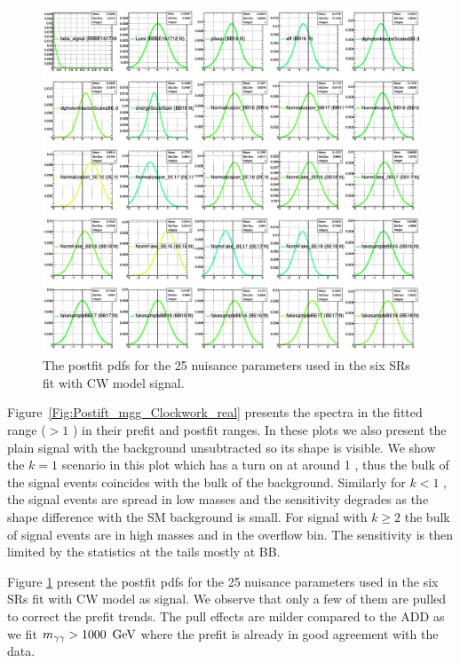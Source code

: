 \begin{figure}[h!]\centering
\includegraphics[width=1.\linewidth]{fig/POST_All_BBBE161718_CWk_real.png}
\caption{The postfit pdfs for the 25 nuisance parameters used in the six SRs fit with CW model signal.}
\label{Fig:Postift_Nuisances_Clockwork_real}
\end{figure}


Figure~\ref{Fig:Postift_mgg_Clockwork_real} presents the \mgg spectra in the fitted range ($>1$ \TeV) in their prefit and postfit ranges. In these plots we also present the plain signal with the background unsubtracted so its shape is visible. We show the $k=1$ \TeV scenario in this plot which has a turn on at around 1 \TeV, thus the bulk of the signal events coincides with the bulk of the background. Similarly for $k<1$ \TeV, the signal events are spread in low masses and the sensitivity degrades as the shape difference with the SM background is small. For signal with $k\ge2$ \TeV the bulk of signal events are in high masses and in the overflow \mgg bin. The sensitivity is then limited by the statistics at the tails mostly at BB.

Figure \ref{Fig:Postift_Nuisances_Clockwork_real} present the postfit pdfs for the 25 nuisance parameters used in the six SRs fit with CW model as signal.
We observe that only a few of them are pulled to correct the prefit trends.
The pull effects are milder compared to the ADD as we fit $m_{\gamma\gamma}>1000~\,\text{Ge\hspace{-.08em}V}$ where the prefit is already in good agreement with the data.

